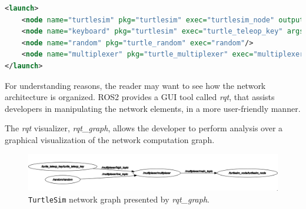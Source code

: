 
% 

\begin{lstlisting}[title={\texttt{TurtleSim} launch file. Note that topic remap is used to properly address the transmission of movement commands from both publishers.}, language=xml]
<launch>
    <node name="turtlesim" pkg="turtlesim" exec="turtlesim_node" output="screen" args="-r /turtle1/cmd_vel:=/main_topic"/>
    <node name="keyboard" pkg="turtlesim" exec="turtle_teleop_key" args="--ros-args -r /turtle1/cmd_vel:=/high_topic"/>
    <node name="random" pkg="turtle_random" exec="random"/>
    <node name="multiplexer" pkg="turtle_multiplexer" exec="multiplexer"/>
</launch>
\end{lstlisting}

For understanding reasons, the reader may want to see how the network architecture is organized. ROS2 provides a GUI tool called \textit{rqt}, that assists developers in manipulating the network elements, in a more user-friendly manner. 

The \textit{rqt} visualizer, \textit{rqt\_graph}, allows the developer to perform analysis over a graphical visualization of the network computation graph.

\begin{figure}[H]
        \centering
        \includegraphics[width=0.8\linewidth]{images/ts_rqt_graph.png}
        \caption{\texttt{TurtleSim} network graph presented by \textit{rqt\_graph}.}
        \label{fig:ts-rqt-graph}
\end{figure}


